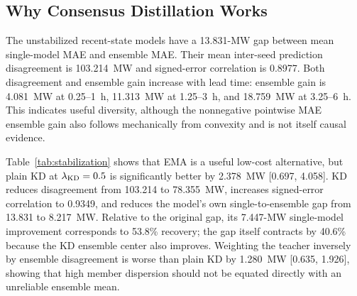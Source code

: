 \documentclass[conference]{IEEEtran}
\begin{document}
\subsection{Why Consensus Distillation Works}

The unstabilized recent-state models have a 13.831-MW gap between mean single-model MAE and ensemble MAE. Their mean inter-seed prediction disagreement is 103.214~MW and signed-error correlation is 0.8977. Both disagreement and ensemble gain increase with lead time: ensemble gain is 4.081~MW at 0.25--1~h, 11.313~MW at 1.25--3~h, and 18.759~MW at 3.25--6~h. This indicates useful diversity, although the nonnegative pointwise MAE ensemble gain also follows mechanically from convexity and is not itself causal evidence.

\begin{table}[t]
\caption{Single-model stabilization relative to the unstabilized recent-state correction (10 matched seeds). Positive improvement is better.}
\label{tab:stabilization}
\centering
\small
\setlength{\tabcolsep}{3.5pt}
\end{table}

Table~\ref{tab:stabilization} shows that EMA is a useful low-cost alternative, but plain KD at $\lambda_{\rm KD}=0.5$ is significantly better by 2.378~MW [0.697, 4.058]. KD reduces disagreement from 103.214 to 78.355~MW, increases signed-error correlation to 0.9349, and reduces the model's own single-to-ensemble gap from 13.831 to 8.217~MW. Relative to the original gap, its 7.447-MW single-model improvement corresponds to 53.8\% recovery; the gap itself contracts by 40.6\% because the KD ensemble center also improves. Weighting the teacher inversely by ensemble disagreement is worse than plain KD by 1.280~MW [0.635, 1.926], showing that high member dispersion should not be equated directly with an unreliable ensemble mean.
\end{document}
